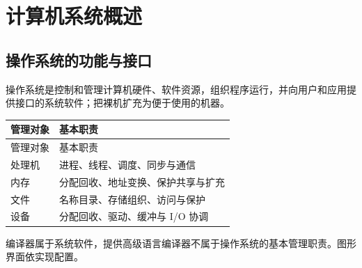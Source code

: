 \chapter{计算机系统概述}\label{OS01}

\section{操作系统的功能与接口}\label{OS01-functions}

操作系统是控制和管理计算机硬件、软件资源，组织程序运行，并向用户和应用提供接口的系统软件；把裸机扩充为便于使用的机器。

\par\smallskip
{\fontsize{9.3}{12}\selectfont\setlength{\tabcolsep}{2.5pt}\setlength{\LTleft}{0pt}\setlength{\LTright}{0pt}
\begin{longtable}{@{}>{\raggedright\arraybackslash}p{}>{\raggedright\arraybackslash}p{}@{}}
\toprule
管理对象 & 基本职责 \\

\midrule\endfirsthead\toprule
管理对象 & 基本职责 \\

\midrule\endhead\bottomrule\endfoot
处理机 & 进程、线程、调度、同步与通信 \\

内存 & 分配回收、地址变换、保护共享与扩充 \\

文件 & 名称目录、存储组织、访问与保护 \\

设备 & 分配回收、驱动、缓冲与 I/O 协调 \\

\end{longtable}}
\par\smallskip

编译器属于系统软件，提供高级语言编译器不属于操作系统的基本管理职责。图形界面依实现配置。

